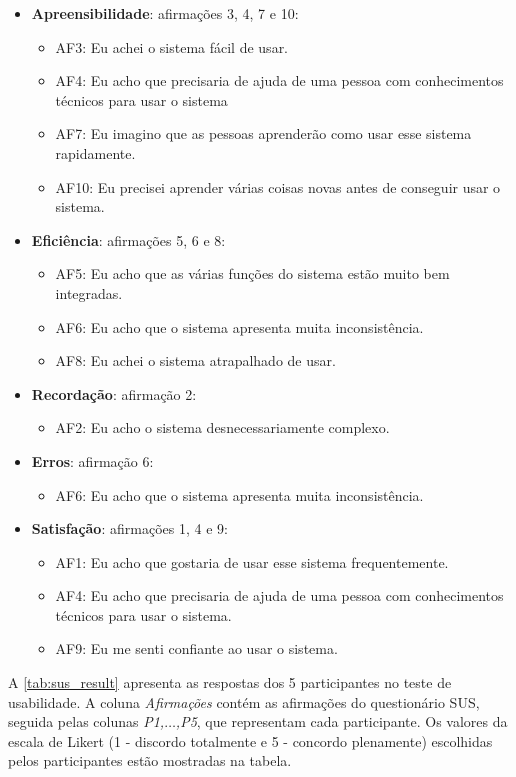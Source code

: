\begin{itemize}
  \item \textbf{Apreensibilidade}: afirmações 3, 4, 7 e 10:
  \begin{itemize}
    \item AF3: Eu achei o sistema fácil de usar.
    \item AF4: Eu acho que precisaria de ajuda de uma pessoa com conhecimentos
    técnicos para usar o sistema
    \item AF7: Eu imagino que as pessoas aprenderão como usar esse sistema
    rapidamente.
    \item AF10: Eu precisei aprender várias coisas novas antes de conseguir
    usar o sistema.
  \end{itemize}
  \item \textbf{Eficiência}: afirmações 5, 6 e 8:
  \begin{itemize}
    \item AF5: Eu acho que as várias funções do sistema estão muito bem
    integradas.
    \item AF6: Eu acho que o sistema apresenta muita inconsistência.
    \item AF8: Eu achei o sistema atrapalhado de usar.
  \end{itemize}
  \item \textbf{Recordação}: afirmação 2:
  \begin{itemize}
    \item AF2: Eu acho o sistema desnecessariamente complexo.
  \end{itemize}
  \item \textbf{Erros}: afirmação 6:
  \begin{itemize}
    \item AF6: Eu acho que o sistema apresenta muita inconsistência.
  \end{itemize}
  \item \textbf{Satisfação}: afirmações 1, 4 e 9:
  \begin{itemize}
    \item AF1: Eu acho que gostaria de usar esse sistema frequentemente.
    \item AF4: Eu acho que precisaria de ajuda de uma pessoa com conhecimentos
    técnicos para usar o sistema.
    \item AF9: Eu me senti confiante ao usar o sistema.
  \end{itemize}
\end{itemize}

A \autoref{tab:sus_result} apresenta as respostas dos 5 participantes no teste de usabilidade.
A coluna \textit{Afirmações} contém as afirmações do questionário SUS, seguida pelas colunas
\textit{P1,$\ldots$,P5}, que representam cada participante. Os valores da escala de Likert
(1 - discordo totalmente e 5 - concordo plenamente) escolhidas pelos participantes estão mostradas
na tabela.

